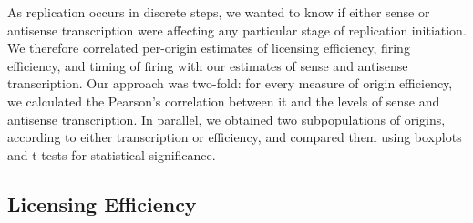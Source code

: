 As replication occurs in discrete steps, we wanted to know if either sense or antisense transcription were affecting any particular stage of replication initiation. We therefore correlated per-origin estimates of licensing efficiency, firing efficiency, and timing of firing \cite{hawkins:2013:highresolution} with our estimates of sense and antisense transcription. Our approach was two-fold: for every measure of origin efficiency, we calculated the Pearson’s correlation between it and the levels of sense and antisense transcription. In parallel, we obtained two subpopulations of origins, according to either transcription or efficiency, and compared them using boxplots and t-tests for statistical significance.

\subsection{Licensing Efficiency}


